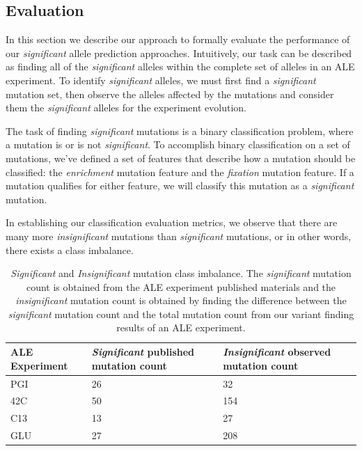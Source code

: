 \documentclass[12pt,final,masters,chapterheads]{ucsd}  %
\begin{document}
\subsection{Evaluation}

%
%

In this section we describe our approach to formally evaluate the performance of our \textit{significant} allele prediction approaches. Intuitively, our task can be described as finding all of the \textit{significant} alleles within the complete set of alleles in an ALE experiment. To identify \textit{significant} alleles, we must first find a \textit{significant} mutation set, then observe the alleles affected by the mutations and consider them the \textit{significant} alleles for the experiment evolution.

The task of finding \textit{significant} mutations is a binary classification problem, where a mutation is or is not \textit{significant}. To accomplish binary classification on a set of mutations, we've defined a set of features that describe how a mutation should be classified: the \textit{enrichment} mutation feature and the \textit{fixation} mutation feature. If a mutation qualifies for either feature, we will classify this mutation as a \textit{significant} mutation.

In establishing our classification evaluation metrics, we observe that there are many more \textit{insignificant} mutations than \textit{significant} mutations, or in other words, there exists a class imbalance.

\begin{table}[h!]
\centering
\begin{tabular}{ p{3cm}p{3cm}p{3cm}  }
 \textbf{ALE Experiment} & \textbf{\textit{Significant} published mutation count} & \textbf{\textit{Insignificant} observed mutation count} \\ [0.5ex] 
 \hline
 PGI & 26 & 32 \\
 42C & 50 & 154 \\ 
 C13 & 13 & 27 \\
 GLU & 27 & 208 \\[1ex] 
\end{tabular}
\caption{\textit{Significant} and \textit{Insignificant} mutation class imbalance. The \textit{significant} mutation count is obtained from the ALE experiment published materials and the \textit{insignificant} mutation count is obtained by finding the difference between the \textit{significant} mutation count and the total mutation count from our variant finding results of an ALE experiment.}
\label{table:1}
\end{table}
\end{document}
